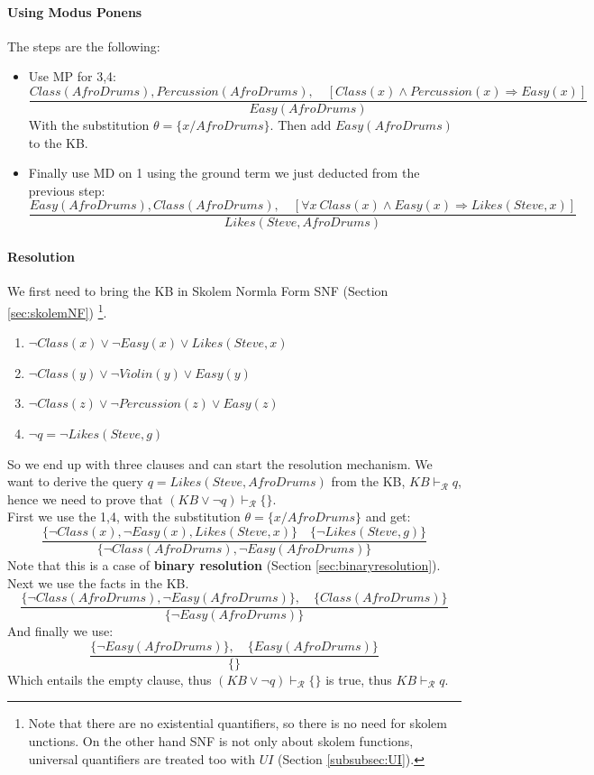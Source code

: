 \documentclass[10pt,a4paper]{article}
\begin{document}
\begin{itemize}
\paragraph{Using Modus Ponens}
The steps are the following:
\begin{itemize}
\item Use MP for 3,4:
\[\frac{Class(AfroDrums), Percussion(AfroDrums),\quad [Class(x)\wedge Percussion(x) \Rightarrow Easy(x)]}{Easy(AfroDrums)}\]
With the substitution $\theta=\lbrace x/AfroDrums \rbrace$. Then add  $Easy(AfroDrums)$ to the KB.

\item Finally use MD on 1 using the ground term we just deducted from the previous step:
\[\frac{Easy(AfroDrums),Class(AfroDrums),\quad [\forall x\ Class(x)\wedge Easy(x) \Rightarrow Likes(Steve,x)]}{Likes(Steve,AfroDrums)}\]
\end{itemize}


\paragraph{Resolution}
We first need to bring the KB in  Skolem Normla Form SNF (Section \ref{sec:skolemNF}) \footnote{Note that there are no existential quantifiers, so there is no need for skolem unctions. On the other hand SNF is not only about skolem functions, universal quantifiers are treated too with $UI$ (Section \ref{subsubsec:UI}). }.

\begin{enumerate}
\item $\neg Class(x) \vee \neg Easy(x) \vee Likes(Steve,x)$
\item $\neg Class(y) \vee \neg Violin(y) \vee Easy(y)$
\item $\neg Class(z) \vee \neg Percussion(z) \vee Easy(z)$
\item $\neg q=\neg Likes(Steve,g)$
\end{enumerate}

So we end up with three clauses and can start the resolution mechanism. We want to derive the query $q=Likes(Steve,AfroDrums)$ from the KB, $KB\vdash_{\mathcal{R}}q$, hence we need to prove that $(KB \vee \neg q) \vdash_{\mathcal{R}} \{\}$.\\
First we use the 1,4, with the substitution $\theta=\lbrace x/AfroDrums\rbrace$ and get:
\[\frac{\lbrace \neg Class(x), \neg Easy(x), Likes(Steve,x)\rbrace\quad \lbrace \neg Likes(Steve,g)\rbrace}{\lbrace \neg Class(AfroDrums), \neg Easy(AfroDrums) \rbrace}\]
Note that this is a case of \textbf{binary resolution} (Section \ref{sec:binaryresolution}). Next we use the facts in the KB.
\[\frac{\lbrace \neg Class(AfroDrums),\neg Easy(AfroDrums) \rbrace,\quad \lbrace Class(AfroDrums) \rbrace}{\lbrace \neg Easy(AfroDrums) \rbrace}\]
And finally we use:
\[\frac{\lbrace \neg Easy(AfroDrums) \rbrace,\quad \lbrace Easy(AfroDrums) \rbrace}{\lbrace \rbrace}\]
Which entails the empty clause, thus $(KB \vee \neg q) \vdash_{\mathcal{R}} \{\}$ is true, thus $KB\vdash_{\mathcal{R}}q$.


\end{itemize}
\end{document}
